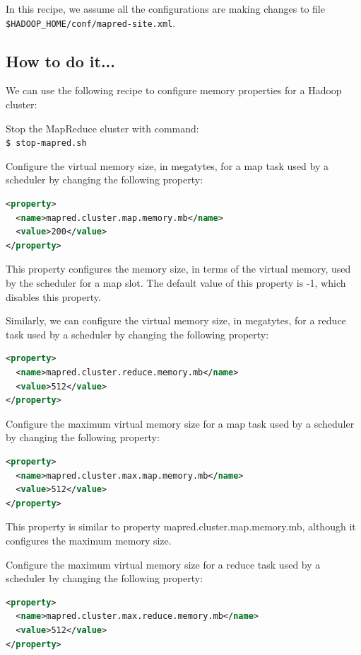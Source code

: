 In this recipe, we assume all the configurations are making changes to file \verb|$HADOOP_HOME/conf/mapred-site.xml|.
\subsection*{How to do it...}
We can use the following recipe to configure memory properties for a Hadoop cluster:

Stop the MapReduce cluster with command: \\
\verb|$ stop-mapred.sh|

Configure the virtual memory size, in megatytes, for a map task used by a scheduler by changing the following property:
\lstset{style=bashstyle}
\begin{lstlisting}[language=XML]
<property>
  <name>mapred.cluster.map.memory.mb</name>
  <value>200</value>
</property>
\end{lstlisting}

This property configures the memory size, in terms of the virtual memory, used by the scheduler for a map slot. The default value of this property is -1, which disables this property.


Similarly, we can configure the virtual memory size, in megatytes, for a reduce task used by a scheduler by changing the following property:
\lstset{style=bashstyle}
\begin{lstlisting}[language=XML]
<property>
  <name>mapred.cluster.reduce.memory.mb</name>
  <value>512</value>
</property>
\end{lstlisting}

Configure the maximum virtual memory size for a map task used by a scheduler by changing the following property:
\lstset{style=bashstyle}
\begin{lstlisting}[language=XML]
<property>
  <name>mapred.cluster.max.map.memory.mb</name>
  <value>512</value>
</property>
\end{lstlisting}

This property is similar to property  mapred.cluster.map.memory.mb, although it configures the maximum memory size.

Configure the maximum virtual memory size for a reduce task used by a scheduler by changing the following property:
\lstset{style=bashstyle}
\begin{lstlisting}[language=XML]
<property>
  <name>mapred.cluster.max.reduce.memory.mb</name>
  <value>512</value>
</property>
\end{lstlisting}

